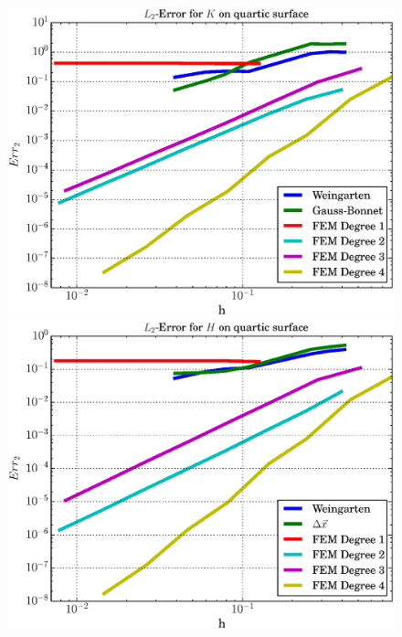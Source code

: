   \begin{figure}
    \begin{minipage}[t]{0.49\textwidth}
       \centering\includegraphics[width=\textwidth]{bilder/Curvature/heineB/ErrKL2.eps}
    \end{minipage}\hfill
    \begin{minipage}[t]{0.49\textwidth}
       \centering\includegraphics[width=\textwidth]{bilder/Curvature/heineB/ErrHL2.eps}
    \end{minipage}\\
    \begin{minipage}[t]{0.49\textwidth}

\end{minipage}
\end{figure}
